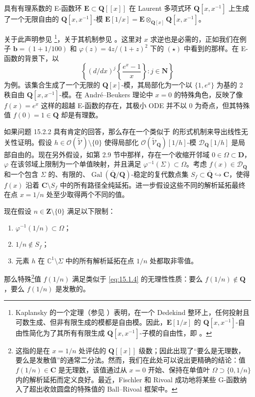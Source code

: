 \begin{fact}\label{fact:15.2.3}
具有有理系数的 E-函数环 \(\mathbf{E} \subset \mathbf{Q}[\![x]\!]\) 在 Laurent 多项式环 \(\mathbf{Q}[x,x^{-1}]\) 上生成了一个无限自由的 \(\mathbf{Q}[x,x^{-1}]\)-模 \(\mathbf{E}[1/x] = \mathbf{E} \otimes_{\mathbf{Q}[x]} \mathbf{Q}[x,x^{-1}]\)。
\end{fact}

关于此声明参见 \cite[定理 1.5]{Beu06}\footnote{Kaplansky 的一个定理（参见 \cite[第 4.1.2 节]{Bos20}）表明，在一个 Dedekind 整环上，任何投射且可数生成、但非有限生成的模都是自由模。因此，\(\mathbf{E}[1/x]\) 的 \(\mathbf{Q}[x,x^{-1}]\)-自由性简化为了其所有有限生成 \(\mathbf{Q}[x,x^{-1}]\)-子模的自由性，即 \cite[定理 1.5]{Beu06}。}，关于其机制参见 \cite[推论 2.2 的证明]{Beu06}。这里对 \(x\) 求逆也是必需的，正如我们在例子 \(\mathbf{b} = (1+1/100)\) 和 \(\varphi(z) = 4z/(1+z)^2\) 下的 \((\star)\) 中看到的那样。在 E-函数的背景下，以
\[ \left\{ (d/dx)^j \left\{ \frac{e^x - 1}{x} \right\} : j \in \mathbf{N} \right\} \]
为例。该集合生成了一个无限的 \(\mathbf{Q}[x]\)-模，其局部化为一个以 \(\{1,e^x\}\) 为基的 2 秩自由 \(\mathbf{Q}[x,x^{-1}]\)-模。在 Andr{\'e}--Beukers 理论中 \(x=0\) 的特殊角色，反映了像 \(f(x)=e^x\) 这样的超越 E-函数的存在，其极小 ODE 并不以 0 为奇点，但其特殊值 \(f(0)=1\in\mathbf{Q}\) 却是有理数。

如果问题 15.2.2 具有肯定的回答，那么存在一个类似于 \cite{BR89, And00b, Beu06} 的形式机制来导出线性无关性证明。假设 \(h \in \mathcal{O}(\widetilde{\mathcal{V}}) \setminus \{0\}\) 使得局部化 \(\mathcal{O}(\widetilde{\mathcal{V}}_{\mathbf{Q}})[1/h]\)-模 \(\mathcal{D}_{\mathbf{Q}}[1/h]\) 是局部自由的。现在另外假设，如第 2.9 节中那样，存在一个收缩开邻域 \(0 \in \Omega \subset \mathbf{D}\)，\(\varphi\) 在该邻域上限制为一个单值映射，并且满足 \(\varphi^{-1}(\Sigma) \subset \Omega\)。考虑 \(f(x) \in \mathcal{D}_{\mathbf{Q}}\) 和一个包含 \(\Sigma\) 的、有限的、\(\operatorname{Gal}(\overline{\mathbf{Q}}/\mathbf{Q})\)-稳定的复代数点集 \(S_f \subset \overline{\mathbf{Q}} \hookrightarrow \mathbf{C}\)，使得 \(f(x)\) 沿着 \(\mathbf{C} \setminus S_f\) 中的所有路径全纯延拓。进一步假设这些不同的解析延拓最终在点 \(x = 1/n\) 处至少取得两个不同的值。

现在假设 \(n \in \mathbf{Z} \setminus \{0\}\) 满足以下限制：
\begin{enumerate}
  \item[(1)] \(\varphi^{-1}(1/n) \subset \Omega\)；
  \item[(2)] \(1/n \notin S_f\)；
  \item[(3)] 元素 \(h\) 在 \(\mathbb{C}^1 \setminus \Sigma\) 中的所有解析延拓在点 \(1/n\) 处都取非零值。
\end{enumerate}
那么特殊\footnote{这指的是在 \(x = 1/n\) 处评估的 \(\mathbf{Q}[\![x]\!]\) 级数；因此出现了“要么是无理数，要么是发散值”的通常二分法。然而，我们在此处可以说出更精确的结论：值 \(f(1/n) \in \mathbf{C}\) 是无理数，该值通过从 \(x = 0\) 开始、保持在单值叶 \(\Omega \supset \{0, 1/n\}\) 内的解析延拓而定义良好。最近，Fischler 和 Rivoal \cite{FR21} 成功地将某些 G-函数纳入了超出收敛圆盘的特殊值的 Ball--Rivoal 框架中。}值 \(f(1/n)\) 满足类似于 \eqref{eq:15.1.4} 的无理性性质：要么 \(f(1/n) \notin \mathbf{Q}\)，要么 \(f(1/n)\) 是发散的。

